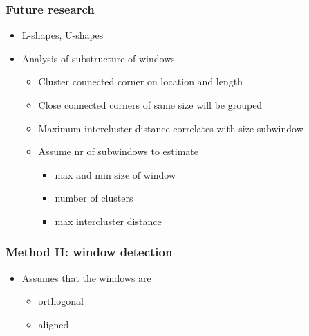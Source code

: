 \documentclass{beamer}
\begin{document}
\frame
{
	\frametitle{Future research}
	\begin{itemize}
	\item <+-| alert@+> L-shapes, U-shapes
	\item <+-| alert@+> Analysis of substructure of windows
	\begin{itemize}
		\item <+-| alert@+> Cluster connected corner on location and length
		\item <+-| alert@+> Close connected corners of same size will be grouped
		\item <+-| alert@+> Maximum intercluster distance correlates with size subwindow
		\item <+-| alert@+> Assume nr of subwindows to estimate 
		\begin{itemize}
			\item max and min size of window
			\item number of clusters
			\item max intercluster distance
		\end{itemize}
	\end{itemize}
	\end{itemize}
}





\frame
{
	\frametitle{Method II: window detection}
	\begin{itemize}
	\item <+-| alert@+> Assumes that the windows are
	\begin{itemize}
		\item <+-| alert@+> orthogonal
		\item <+-| alert@+> aligned
	\end{itemize}
	\end{itemize}

}
\end{document}
